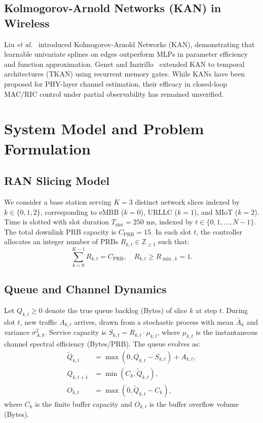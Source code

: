 \documentclass[conference]{IEEEtran}
\begin{document}
\subsection{Kolmogorov-Arnold Networks (KAN) in Wireless}
Liu \textit{et al.}~\cite{liu2024kan} introduced Kolmogorov-Arnold Networks (KAN), demonstrating that learnable univariate splines on edges outperform MLPs in parameter efficiency and function approximation. Genet and Inzirillo~\cite{genet2024tkan} extended KAN to temporal architectures (TKAN) using recurrent memory gates. While KANs have been proposed for PHY-layer channel estimation, their efficacy in closed-loop MAC/RIC control under partial observability has remained unverified.

\section{System Model and Problem Formulation}
\subsection{RAN Slicing Model}
We consider a base station serving $K=3$ distinct network slices indexed by $k \in \{0, 1, 2\}$, corresponding to eMBB ($k=0$), URLLC ($k=1$), and MIoT ($k=2$). Time is slotted with slot duration $T_{\text{slot}} = 250\text{ ms}$, indexed by $t \in \{0, 1, \dots, N-1\}$. The total downlink PRB capacity is $C_{\text{PRB}} = 15$. In each slot $t$, the controller allocates an integer number of PRBs $R_{k, t} \in \mathbb{Z}_{\ge 1}$ such that:
\begin{equation}
\sum_{k=0}^{K-1} R_{k, t} = C_{\text{PRB}}, \quad R_{k, t} \ge R_{\min, k} = 1.
\end{equation}

\subsection{Queue and Channel Dynamics}
Let $Q_{k, t} \ge 0$ denote the true queue backlog (Bytes) of slice $k$ at step $t$. During slot $t$, new traffic $A_{k, t}$ arrives, drawn from a stochastic process with mean $\bar{A}_k$ and variance $\sigma_{A, k}^2$. Service capacity is $S_{k, t} = R_{k, t} \cdot \mu_{k, t}$, where $\mu_{k, t}$ is the instantaneous channel spectral efficiency (Bytes/PRB). The queue evolves as:
\begin{align}
\tilde{Q}_{k, t} &= \max\left(0, Q_{k, t} - S_{k, t}\right) + A_{k, t}, \\
Q_{k, t+1} &= \min\left(C_k, \tilde{Q}_{k, t}\right), \\
O_{k, t} &= \max\left(0, \tilde{Q}_{k, t} - C_k\right),
\end{align}
where $C_k$ is the finite buffer capacity and $O_{k, t}$ is the buffer overflow volume (Bytes).
\end{document}
